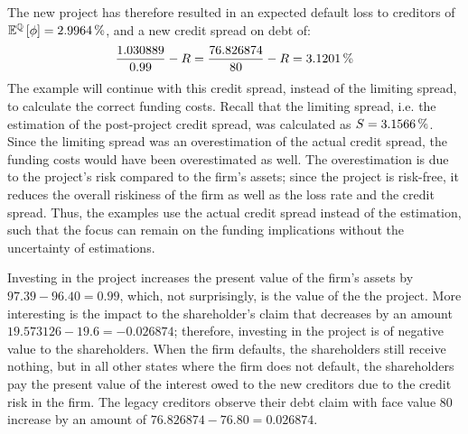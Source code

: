 \documentclass[main.tex]{subfiles}
\begin{document}
        The new project has therefore resulted in an expected default loss to creditors of 
        $\mathbb{E}^{\rnmeasure}\left[\phi\right] = \pct{0.029964}$,
        and a new credit spread on debt of:
        \begin{equation*}
            \frac{
                1.030889
            }{    
                0.99
            } 
            -
            R
            = 
            \frac{
                76.826874
            }{    
                80
            } 
            -
            R
            =
            \pct{0.031201}
        \end{equation*}
        The example will continue with this credit spread, instead of the limiting spread,
        to calculate the correct funding costs.
        Recall that the limiting spread, i.e. the estimation of the post-project credit spread, 
        was calculated as $S = \pct{0.031566}$.
        Since the limiting spread was an overestimation of the actual credit spread,
        the funding costs would have been overestimated as well.
        The overestimation is due to the project's risk compared to the firm's assets;
        since the project is risk-free, it reduces the overall riskiness of the firm
        as well as the loss rate and the credit spread.
        Thus, the examples use the actual credit spread instead of the estimation, 
        such that the focus can remain on the funding implications
        without the uncertainty of estimations.

        Investing in the project increases the present value of the firm's assets by $\num{97.39} - \num{96.40} = \num{0.99}$, 
        which, not surprisingly, is the value of the the project.
        More interesting is the impact to the shareholder's claim that decreases by an amount $\num{19.573126} - \num{19.6} = \num{-0.026874}$; 
        therefore, investing in the project is of negative value to the shareholders.
        When the firm defaults, the shareholders still receive nothing, 
        but in all other states where the firm does not default, 
        the shareholders pay the present value of the interest owed to the new creditors 
        due to the credit risk in the firm.
        The legacy creditors observe their debt claim with face value $\num{80}$ increase by an amount of
        $\num{76.826874} - \num{76.80} = \num{0.026874}$.
\end{document}
